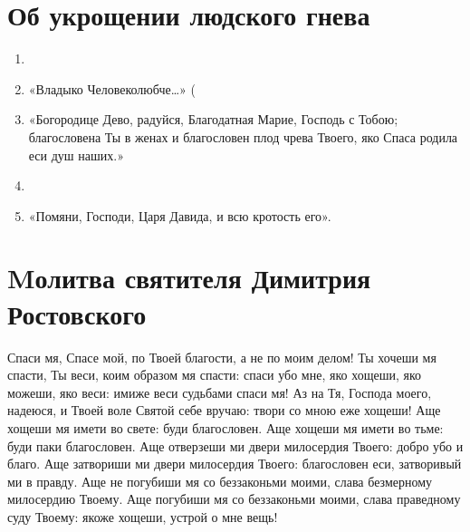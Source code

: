 \vspace{-1.5\baselineskip}\section{Об укрощении людского гнева}\begin{mymulticols}
 
\begin{enumerate}

\item {}

\item {} «Владыко Человеколюбче…» (

\item {} «Богородице Дево, радуйся, Благодатная Марие, Господь с Тобою; благословена Ты в женах и благословен плод чрева Твоего, яко Спаса родила еси душ наших.»

\item {}

\item {} «Помяни, Господи, Царя Давида, и всю кротость его».

\end{enumerate}

\end{mymulticols}

\vspace{-1.5\baselineskip}\section{Mолитва святителя Димитрия Ростовского}\begin{mymulticols}
 

Спаси мя, Спасе мой, по Твоей благости, а не по моим делом! Ты хочеши мя спасти, Ты веси, коим образом мя спасти: спаси убо мне, яко хощеши, яко можеши, яко веси: имиже веси судьбами спаси мя! Аз на Тя, Господа моего, надеюся, и Твоей воле Святой себе вручаю: твори со мною еже хощеши! Аще хощеши мя имети во свете: буди благословен. Аще хощеши мя имети во тьме: буди паки благословен. Аще отверзеши ми двери милосердия Твоего: добро убо и благо. Аще затвориши ми двери милосердия Твоего: благословен еси, затворивый ми в правду. Аще не погубиши мя со беззаконьми моими, слава безмерному милосердию Твоему. Аще погубиши мя со беззаконьми моими, слава праведному суду Твоему: якоже хощеши, устрой о мне вещь!

\end{mymulticols}

